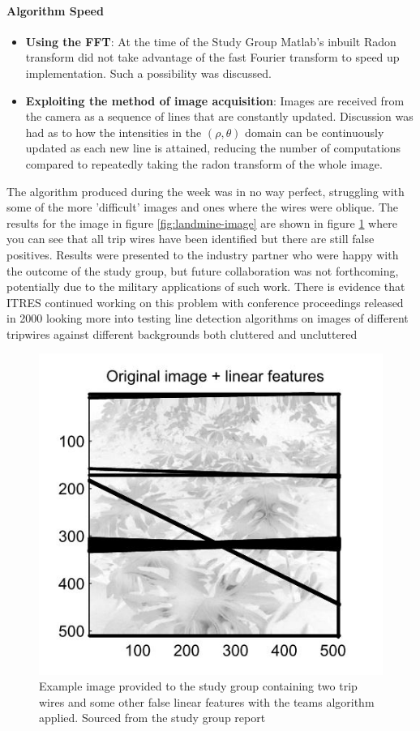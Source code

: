 \documentclass[11pt]{article} %
\begin{document}
	\paragraph{Algorithm Speed}
		\begin{itemize}
		\item \textbf{Using the FFT}: At the time of the Study Group Matlab's inbuilt Radon transform did not take advantage of the fast Fourier transform to speed up implementation. Such a possibility was discussed. 
		\item \textbf{Exploiting the method of image acquisition}: Images are received from the camera as a sequence of lines that are constantly updated. Discussion was had as to how the intensities in the $ (\rho, \theta)$ domain can be continuously updated as each new line is attained, reducing the number of computations compared to repeatedly taking the radon transform of the whole image. 
	\end{itemize}
	
	The algorithm produced during the week was in no way perfect, struggling with some of the more 'difficult' images and ones where the wires were oblique. The results for the image in figure \ref{fig:landmine-image} are shown in figure \ref{fig:landmine-linear-features}   where you can see that all trip wires have been identified but there are still false positives. Results were presented to the industry partner who were happy with the outcome of the study group,  but future collaboration was not forthcoming, potentially due to the military applications of such work. There is evidence that ITRES continued working on this problem with conference proceedings released in 2000 \cite{Babey} looking more into testing line detection algorithms on images of different tripwires against different backgrounds both cluttered and uncluttered
	
\begin{figure}
	\centering
	\includegraphics[width=0.7\linewidth]{"Report_images/landmine linear features"}
	\caption{Example image provided to the study group containing two trip wires and some other false linear features with the teams algorithm applied. Sourced from the study group report \cite{Jessop}}
	\label{fig:landmine-linear-features}
\end{figure}
\end{document}
